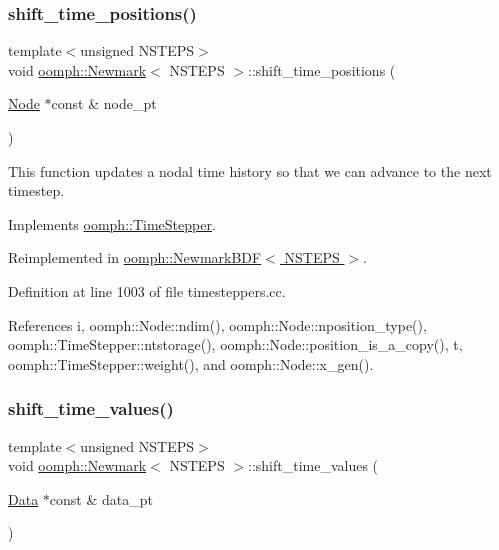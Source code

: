 \subsubsection{\texorpdfstring{shift\+\_\+time\+\_\+positions()}{shift\_time\_positions()}}
{\footnotesize\ttfamily template$<$unsigned N\+S\+T\+E\+PS$>$ \\
void \hyperlink{classoomph_1_1Newmark}{oomph\+::\+Newmark}$<$ N\+S\+T\+E\+PS $>$\+::shift\+\_\+time\+\_\+positions (\begin{DoxyParamCaption}\item[{\hyperlink{classoomph_1_1Node}{Node} $\ast$const \&}]{node\+\_\+pt }\end{DoxyParamCaption})\hspace{0.3cm}{\ttfamily [virtual]}}



This function updates a nodal time history so that we can advance to the next timestep. 



Implements \hyperlink{classoomph_1_1TimeStepper_a518b1bee5dc3aae8c5ef13560d1954ac}{oomph\+::\+Time\+Stepper}.



Reimplemented in \hyperlink{classoomph_1_1NewmarkBDF_a86ac259d50e62295d13790a5fe49010d}{oomph\+::\+Newmark\+B\+D\+F$<$ N\+S\+T\+E\+P\+S $>$}.



Definition at line 1003 of file timesteppers.\+cc.



References i, oomph\+::\+Node\+::ndim(), oomph\+::\+Node\+::nposition\+\_\+type(), oomph\+::\+Time\+Stepper\+::ntstorage(), oomph\+::\+Node\+::position\+\_\+is\+\_\+a\+\_\+copy(), t, oomph\+::\+Time\+Stepper\+::weight(), and oomph\+::\+Node\+::x\+\_\+gen().

\mbox{\label{classoomph_1_1Newmark_a3f8606d569f947669006b9b079ac4c82}} 
\subsubsection{\texorpdfstring{shift\+\_\+time\+\_\+values()}{shift\_time\_values()}}
{\footnotesize\ttfamily template$<$unsigned N\+S\+T\+E\+PS$>$ \\
void \hyperlink{classoomph_1_1Newmark}{oomph\+::\+Newmark}$<$ N\+S\+T\+E\+PS $>$\+::shift\+\_\+time\+\_\+values (\begin{DoxyParamCaption}\item[{\hyperlink{classoomph_1_1Data}{Data} $\ast$const \&}]{data\+\_\+pt }\end{DoxyParamCaption})\hspace{0.3cm}{\ttfamily [virtual]}}



